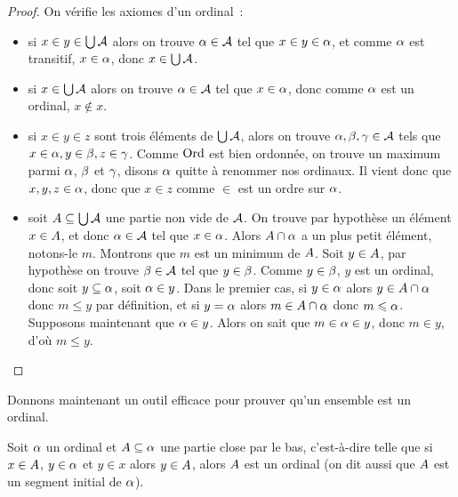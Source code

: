 \begin{proof}
  On vérifie les axiomes d'un ordinal~:
  \begin{itemize}
  \item si $x\in y\in \bigcup \mathcal A$ alors on trouve $\alpha \in \mathcal A$ tel
    que $x\in y \in \alpha$, et comme $\alpha$ est transitif, $x\in \alpha$,
    donc $x\in \bigcup \mathcal A$.
  \item si $x\in \bigcup \mathcal A$ alors on trouve $\alpha \in \mathcal A$ tel que
    $x\in \alpha$, donc comme $\alpha$ est un ordinal, $x\notin x$.
  \item si $x\in y\in z$ sont trois éléments de $\bigcup \mathcal A$, alors on
    trouve $\alpha,\beta,\gamma\in \mathcal A$ tels que
    $x\in \alpha,y\in \beta,z\in\gamma$.
    Comme $\operatorname{Ord}$ est bien ordonnée, on trouve un maximum parmi $\alpha$,
    $\beta$ et $\gamma$, disons $\alpha$ quitte à renommer nos ordinaux.
    Il vient donc que $x,y,z\in\alpha$, donc que $x\in z$ comme $\in$
    est un ordre sur $\alpha$.
  \item soit $A\subseteq \bigcup \mathcal A$ une partie non vide de $\mathcal A$.
    On trouve par hypothèse un élément $x\in A$, et donc
    $\alpha \in \mathcal A$ tel que $x\in\alpha$.
    Alors $A\cap \alpha$ a un plus petit élément, notons-le $m$. Montrons
    que $m$ est un minimum de $A$. Soit $y\in A$, par hypothèse on
    trouve $\beta\in \mathcal A$ tel que $y\in \beta$. Comme $y\in \beta$, $y$
    est un ordinal, donc soit $y\subseteq \alpha$, soit $\alpha \in y$. Dans le
    premier cas, si $y\in \alpha$ alors $y\in A \cap \alpha$ donc
    $m \leq y$ par définition, et si $y=\alpha$ alors $m\in A \cap \alpha$
    donc $m \leqslant \alpha$. Supposons maintenant que $\alpha \in y$. Alors on sait
    que $m\in \alpha\in y$, donc $m\in y$, d'où $m\leq y$.\qedhere
  \end{itemize}
\end{proof}

\noindent
Donnons maintenant un outil efficace pour prouver qu'un ensemble est un ordinal.

\begin{proposition}
  Soit $\alpha$ un ordinal et $A\subseteq \alpha$ une partie close par le
  bas, c'est-à-dire telle que si $x\in A$, $y\in \alpha$ et $y\in x$ alors
  $y\in A$, alors $A$ est un ordinal (on dit aussi que $A$ est un
  segment initial de $\alpha$).
\end{proposition}

